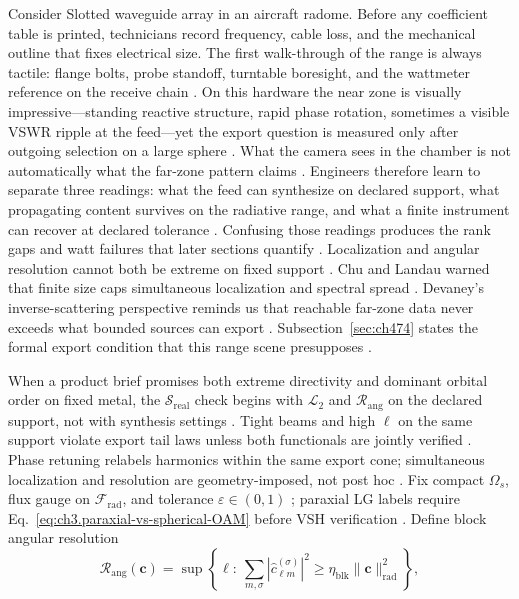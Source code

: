 \begin{physicalvignette}
Consider Slotted waveguide array in an aircraft radome. Before any coefficient table is printed, technicians record frequency, cable loss, and the mechanical outline that fixes electrical size. The first walk-through of the range is always tactile: flange bolts, probe standoff, turntable boresight, and the wattmeter reference on the receive chain \cite{hansen1988}.
On this hardware the near zone is visually impressive---standing reactive structure, rapid phase rotation, sometimes a visible VSWR ripple at the feed---yet the export question is measured only after outgoing selection on a large sphere \cite{harrington2001}. What the camera sees in the chamber is not automatically what the far-zone pattern claims \cite{stratton1941}.
Engineers therefore learn to separate three readings: what the feed can synthesize on declared support, what propagating content survives on the radiative range, and what a finite instrument can recover at declared tolerance \cite{devaney2004}. Confusing those readings produces the rank gaps and watt failures that later sections quantify \cite{pal2026}.
Localization and angular resolution cannot both be extreme on fixed support . 
Chu and Landau warned that finite size caps simultaneous localization and spectral spread \cite{chu1948}. Devaney's inverse-scattering perspective reminds us that reachable far-zone data never exceeds what bounded sources can export \cite{devaney2004}.
Subsection~\ref{sec:ch474} states the formal export condition that this range scene presupposes \cite{stratton1941}.
\end{physicalvignette}
When a product brief promises both extreme directivity and dominant orbital order on fixed metal, the $\mathcal{S}_{\mathrm{real}}$ check begins with $\mathcal{L}_{2}$ and $\mathcal{R}_{\mathrm{ang}}$ on the declared support, not with synthesis settings \cite{collin2001}. Tight beams and high $\ell$ on the same support violate export tail laws unless both functionals are jointly verified \cite{hansen1988}. Phase retuning relabels harmonics within the same export cone; simultaneous localization and resolution are geometry-imposed, not post hoc \cite{stratton1941}. Fix compact $\Omega_{s}$, flux gauge on $\mathcal{F}_{\mathrm{rad}}$, and tolerance $\varepsilon\in(0,1)$ \cite{jackson1999}; paraxial LG labels require Eq.~\eqref{eq:ch3.paraxial-vs-spherical-OAM} before VSH verification \cite{harrington2001}.
Define block angular resolution
\begin{equation}
\label{eq:ch4.angular-resolution-functional}
\mathcal{R}_{\mathrm{ang}}(\mathbf{c})=\sup\left\{\ell:\ \sum_{m,\sigma}|\widehat{c}_{\ell m}^{(\sigma)}|^{2}\ge\eta_{\mathrm{blk}}\|\mathbf{c}\|_{\mathrm{rad}}^{2}\right\},
\end{equation}
